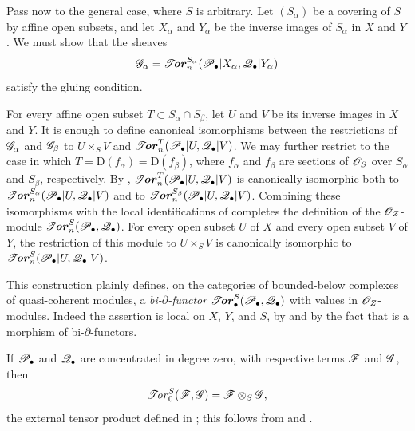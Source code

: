 \begin{env}[6.5.3]
\label{III.6.5.3}
Pass now to the general case, where $S$ is arbitrary.  Let
$(S_\alpha)$ be a covering of $S$ by affine open subsets, and let
$X_\alpha$ and $Y_\alpha$ be the inverse images of $S_\alpha$ in
$X$ and $Y$.  We must show that the sheaves
\[
  \mathscr{G}_\alpha
  =
  \boldsymbol{\mathscr{T}\!\mathit{or}}_n^{S_\alpha}
  (\mathscr{P}_\bullet|X_\alpha,\mathscr{Q}_\bullet|Y_\alpha)
\]
satisfy the gluing condition.

For every affine open subset
$T\subset S_\alpha\cap S_\beta$, let $U$ and $V$ be its inverse
images in $X$ and $Y$.  It is enough to define canonical
isomorphisms between the restrictions of $\mathscr{G}_\alpha$ and
$\mathscr{G}_\beta$ to $U\times_SV$ and $\boldsymbol{\mathscr{T}\!\mathit{or}}_n^T(\mathscr{P}_\bullet|U,\mathscr{Q}_\bullet|V)$.
We may further restrict to the case in which
$T=\mathrm D(f_\alpha)=\mathrm D(f_\beta)$, where $f_\alpha$ and
$f_\beta$ are sections of $\mathscr{O}_S$ over $S_\alpha$ and
$S_\beta$, respectively.  By , $\boldsymbol{\mathscr{T}\!\mathit{or}}_n^T(\mathscr{P}_\bullet|U,\mathscr{Q}_\bullet|V)$
is canonically isomorphic both to
$\boldsymbol{\mathscr{T}\!\mathit{or}}_n^{S_\alpha}(\mathscr{P}_\bullet|U,\mathscr{Q}_\bullet|V)$ and to
$\boldsymbol{\mathscr{T}\!\mathit{or}}_n^{S_\beta}(\mathscr{P}_\bullet|U,\mathscr{Q}_\bullet|V)$.
Combining these isomorphisms with the local identifications of
 completes the definition of the
$\mathscr{O}_Z$-module $\boldsymbol{\mathscr{T}\!\mathit{or}}_n^S(\mathscr{P}_\bullet,\mathscr{Q}_\bullet)$.
For every open subset $U$ of $X$ and every open subset $V$ of
$Y$, the restriction of this module to $U\times_SV$ is
canonically isomorphic to $\boldsymbol{\mathscr{T}\!\mathit{or}}_n^S(\mathscr{P}_\bullet|U,\mathscr{Q}_\bullet|V)$.

This construction plainly defines, on the categories of
bounded-below complexes of quasi-coherent modules, a
\emph{bi-$\partial$-functor} $\boldsymbol{\mathscr{T}\!\mathit{or}}_\bullet^S(\mathscr{P}_\bullet,\mathscr{Q}_\bullet)$
with values in $\mathscr{O}_Z$-modules.  Indeed the assertion is local
on $X$, $Y$, and $S$, by  and by the fact that
 is a morphism of bi-$\partial$-functors.

If $\mathscr{P}_\bullet$ and $\mathscr{Q}_\bullet$ are concentrated in degree
zero, with respective terms $\mathscr{F}$ and $\mathscr{G}$, then
\[
  \mathscr{T}\!\mathit{or}_0^S(\mathscr{F},\mathscr{G})
  =
  \mathscr{F}\otimes_S\mathscr{G},
\]
the external tensor product defined in ; this
follows from  and .
\end{env}

